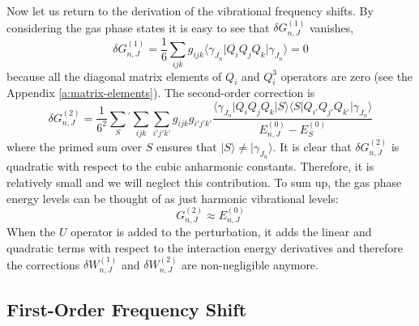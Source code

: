 \documentclass[b5paper,oneside,fleqn,11pt]{book}
\begin{document}
\begin{refsection}
Now let us return to the derivation of the vibrational frequency shifts. 
By considering the gas phase states it is easy to see that 
$\delta G_{n,J}^{(1)}$ vanishes,
%
\begin{equation}
\delta G_{n,J}^{(1)} = \frac{1}{6}\sum_{ijk} g_{ijk} 
\langle \gamma_{J_n} \vert Q_iQ_jQ_k \vert \gamma_{J_n} \rangle = 0
\end{equation}
%
because all the diagonal matrix elements of $Q_i$ and $Q_i^3$ operators
are zero (see the Appendix \ref{a:matrix-elements}).  %
The second\hyp{}order correction is 
%
\begin{equation}
\delta G_{n,J}^{(2)} = \frac{1}{6^2} \sum_{S}{^{'}} \sum_{ijk}\sum_{i'j'k'} g_{ijk} g_{i'j'k'}
\frac{\langle \gamma_{J_n} \vert Q_iQ_jQ_k \vert S \rangle \langle S \vert Q_{i'}Q_{j'}Q_{k'} \vert \gamma_{J_n} \rangle }
{ E_{n,J}^{(0)} - E_{S}^{(0)} }
\end{equation}
%
where the primed sum over $S$ ensures that $\vert S \rangle \ne \vert \gamma_{J_n} \rangle$. 
It is clear that $\delta G_{n,J}^{(2)}$ is quadratic with respect to the cubic anharmonic constants.
Therefore, it is relatively small and we will neglect this contribution.
To sum up, the gas phase energy levels can be thought of as just 
harmonic vibrational levels:
%
\begin{equation}\label{e:ge}
G_{n,J}^{(2)} \approx E_{n,J}^{(0)}
\end{equation}
%
When the $U$ operator is added to the perturbation, it adds the linear
and quadratic terms with respect to the interaction energy derivatives and therefore
the corrections $\delta W_{n,J}^{(1)}$ and $\delta W_{n,J}^{(2)}$ 
are non\hyp{}negligible anymore.

\subsection{First-Order Frequency Shift}


\end{refsection}
\end{document}
